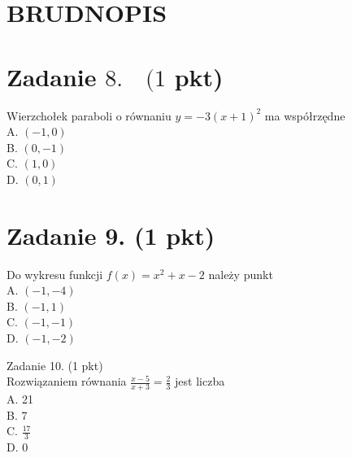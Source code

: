 \documentclass[10pt]{article}
\begin{document}
\section*{BRUDNOPIS}
\section*{Zadanie \(8 . \quad(1\) pkt)}
Wierzchołek paraboli o równaniu \(y=-3(x+1)^{2}\) ma współrzędne\\
A. \((-1,0)\)\\
B. \((0,-1)\)\\
C. \((1,0)\)\\
D. \((0,1)\)

\section*{Zadanie 9. (1 pkt)}
Do wykresu funkcji \(f(x)=x^{2}+x-2\) należy punkt\\
A. \((-1,-4)\)\\
B. \((-1,1)\)\\
C. \((-1,-1)\)\\
D. \((-1,-2)\)

Zadanie 10. (1 pkt)\\
Rozwiązaniem równania \(\frac{x-5}{x+3}=\frac{2}{3}\) jest liczba\\
A. 21\\
B. 7\\
C. \(\frac{17}{3}\)\\
D. 0
\end{document}
